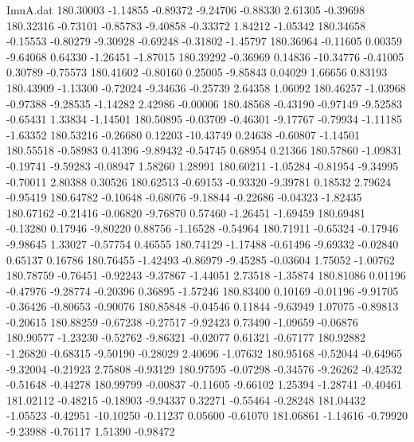 \begin{filecontents}{ImuA.dat}
 180.30003   -1.14855   -0.89372   -9.24706   -0.88330    2.61305   -0.39698
 180.32316   -0.73101   -0.85783   -9.40858   -0.33372    1.84212   -1.05342
 180.34658   -0.15553   -0.80279   -9.30928   -0.69248   -0.31802   -1.45797
 180.36964   -0.11605    0.00359   -9.64068    0.64330   -1.26451   -1.87015
 180.39292   -0.36969    0.14836  -10.34776   -0.41005    0.30789   -0.75573
 180.41602   -0.80160    0.25005   -9.85843    0.04029    1.66656    0.83193
 180.43909   -1.13300   -0.72024   -9.34636   -0.25739    2.64358    1.06092
 180.46257   -1.03968   -0.97388   -9.28535   -1.14282    2.42986   -0.00006
 180.48568   -0.43190   -0.97149   -9.52583   -0.65431    1.33834   -1.14501
 180.50895   -0.03709   -0.46301   -9.17767   -0.79934   -1.11185   -1.63352
 180.53216   -0.26680    0.12203  -10.43749    0.24638   -0.60807   -1.14501
 180.55518   -0.58983    0.41396   -9.89432   -0.54745    0.68954    0.21366
 180.57860   -1.09831   -0.19741   -9.59283   -0.08947    1.58260    1.28991
 180.60211   -1.05284   -0.81954   -9.34995   -0.70011    2.80388    0.30526
 180.62513   -0.69153   -0.93320   -9.39781    0.18532    2.79624   -0.95419
 180.64782   -0.10648   -0.68076   -9.18844   -0.22686   -0.04323   -1.82435
 180.67162   -0.21416   -0.06820   -9.76870    0.57460   -1.26451   -1.69459
 180.69481   -0.13280    0.17946   -9.80220    0.88756   -1.16528   -0.54964
 180.71911   -0.65324   -0.17946   -9.98645    1.33027   -0.57754    0.46555
 180.74129   -1.17488   -0.61496   -9.69332   -0.02840    0.65137    0.16786
 180.76455   -1.42493   -0.86979   -9.45285   -0.03604    1.75052   -1.00762
 180.78759   -0.76451   -0.92243   -9.37867   -1.44051    2.73518   -1.35874
 180.81086    0.01196   -0.47976   -9.28774   -0.20396    0.36895   -1.57246
 180.83400    0.10169   -0.01196   -9.91705   -0.36426   -0.80653   -0.90076
 180.85848   -0.04546    0.11844   -9.63949    1.07075   -0.89813   -0.20615
 180.88259   -0.67238   -0.27517   -9.92423    0.73490   -1.09659   -0.06876
 180.90577   -1.23230   -0.52762   -9.86321   -0.02077    0.61321   -0.67177
 180.92882   -1.26820   -0.68315   -9.50190   -0.28029    2.40696   -1.07632
 180.95168   -0.52044   -0.64965   -9.32004   -0.21923    2.75808   -0.93129
 180.97595   -0.07298   -0.34576   -9.26262   -0.42532   -0.51648   -0.44278
 180.99799   -0.00837   -0.11605   -9.66102    1.25394   -1.28741   -0.40461
 181.02112   -0.48215   -0.18903   -9.94337    0.32271   -0.55464   -0.28248
 181.04432   -1.05523   -0.42951  -10.10250   -0.11237    0.05600   -0.61070
 181.06861   -1.14616   -0.79920   -9.23988   -0.76117    1.51390   -0.98472

\end{filecontents}
